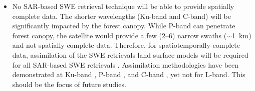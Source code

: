 \begin{enumerate}
\begin{itemize}
    \item No SAR-based SWE retrieval technique will be able to provide spatially complete data. The shorter wavelengths (Ku-band and C-band) will be significantly impacted by the forest canopy. While P-band can penetrate forest canopy, the satellite would provide a few (2--6) narrow swaths ($\sim$1~km) and not spatially complete data. Therefore, for spatiotemporally complete data, assimilation of the SWE retrievals land surface models will be required for all SAR-based SWE retrievals \citep{girottoDataAssimilationImproves2020}. Assimilation methodologies have been demonstrated at Ku-band \citep{wrzesienDevelopmentNatureRun2022, choEvaluatingUtilityActive2022}, P-band \citep{maEstimatingSpatiotemporallyContinuous2023}, and C-band \citep{girottoIdentifyingSnowfallElevation2023, brangersSentinel1SnowDepth}, yet not for L-band. This should be the focus of future studies.
    
   \end{itemize}
\end{enumerate}





